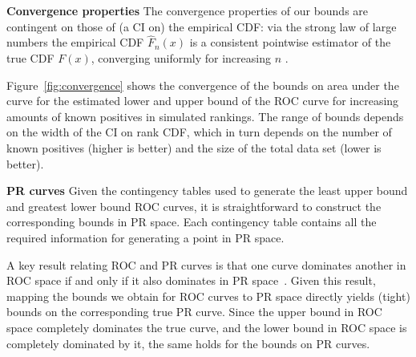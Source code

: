 {\bf Convergence properties} \label{convergence}
The convergence properties of our bounds are contingent on those of (a CI on) the empirical CDF:
via the strong law of large numbers the empirical CDF $\hat{F}_n(x)$ is a consistent pointwise estimator of the true CDF $F(x)$, converging uniformly for increasing $n$ \cite{van2000asymptotic}. %

Figure~\ref{fig:convergence} shows the convergence of the bounds on area under the curve for the estimated lower and upper bound of the ROC curve for increasing amounts of known positives in simulated rankings. The range of bounds depends on the width of the CI on rank CDF, which in turn depends on the number of known positives (higher is better) and the size of the total data set (lower is better).



{\bf PR curves} Given the contingency tables used to generate the least upper bound and greatest lower bound ROC curves, it is straightforward to construct the corresponding bounds in PR space. Each contingency table contains all the required information for generating a point in PR space. 

 A key result relating ROC and PR curves is that one curve dominates another in ROC space if and only if it also dominates in PR space~\citep{davis2006relationship}. Given this result, mapping the bounds we obtain for ROC curves to PR space directly yields (tight) bounds on the corresponding true PR curve. Since the upper bound in ROC space completely dominates the true curve, and the lower bound in ROC space is completely dominated by it, the same holds for the bounds on PR curves.



